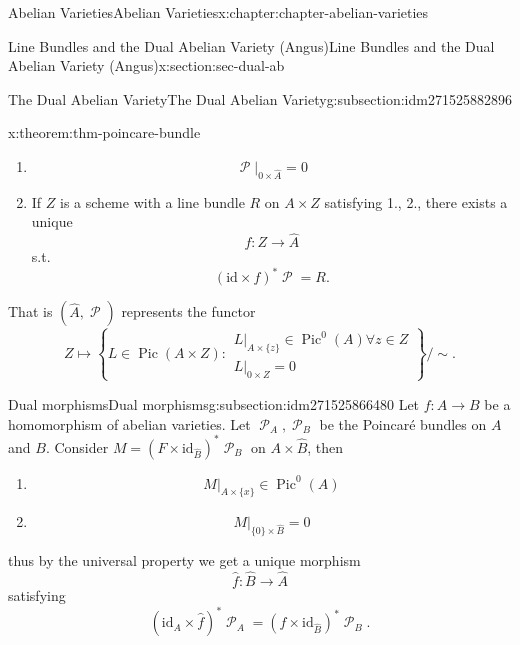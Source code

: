\documentclass[oneside,10pt,]{book}
\numberwithin{equation}{section}
\newcommand{\sheaf}[1]{\operatorname{\mathcal{#1}}}
\newcommand{\id}{\mathrm{id}}
\DeclareMathOperator{\Pic}{Pic}
\begin{document}
\begin{chapterptx}{Abelian Varieties}{}{Abelian Varieties}{}{}{x:chapter:chapter-abelian-varieties}
\begin{sectionptx}{Line Bundles and the Dual Abelian Variety (Angus)}{}{Line Bundles and the Dual Abelian Variety (Angus)}{}{}{x:section:sec-dual-ab}
\begin{subsectionptx}{The Dual Abelian Variety}{}{The Dual Abelian Variety}{}{}{g:subsection:idm271525882896}
\begin{theorem}{}{}{x:theorem:thm-poincare-bundle}
\begin{enumerate}
%
\item{}%
\begin{equation*}
\sheaf P|_{0\times \hat A} = 0
\end{equation*}
%
\item{}If \(Z\) is a  scheme with a line bundle \(R\) on \(A\times Z\) satisfying 1., 2., there exists a unique%
\begin{equation*}
f\colon Z\to \hat A
\end{equation*}
s.t.%
\begin{equation*}
(\id\times f)^* \sheaf P = R\text{.}
\end{equation*}
%
\end{enumerate}
That is \((\hat A, \sheaf P)\)  represents the functor%
\begin{equation*}
Z \mapsto \left\{ L\in \Pic (A\times Z) : \substack{ L|_{A\times \{z\}} \in \Pic^0(A) \forall z\in Z \\L|_{ 0 \times Z } = 0}\right\}/\sim\text{.}
\end{equation*}
%
\end{theorem}
\end{subsectionptx}
%
%
\typeout{************************************************}
\typeout{************************************************}
%
\begin{subsectionptx}{Dual morphisms}{}{Dual morphisms}{}{}{g:subsection:idm271525866480}
Let \(f\colon A\to B\) be a homomorphism of abelian varieties. Let \(\sheaf P_A,\sheaf P_B\) be the Poincaré bundles on  \(A\) and \(B\). Consider \(M=    (F\times \id_{\hat B})^* \sheaf P_B\) on \(A\times \hat B\), then%
\begin{enumerate}
\item{}%
\begin{equation*}
M|_{A\times \{x\}} \in \Pic^0(A)
\end{equation*}
%
\item{}%
\begin{equation*}
M|_{\{0\} \times \hat B} = 0
\end{equation*}
%
\end{enumerate}
thus by the universal property we get a unique morphism%
\begin{equation*}
\hat f\colon \hat B \to \hat A
\end{equation*}
satisfying%
\begin{equation*}
(\id_A\times \hat f)^* \sheaf P_A = (f\times \id_{\hat B})^*\sheaf P_B\text{.}
\end{equation*}

\end{subsectionptx}
\end{sectionptx}
\end{chapterptx}
\end{document}
